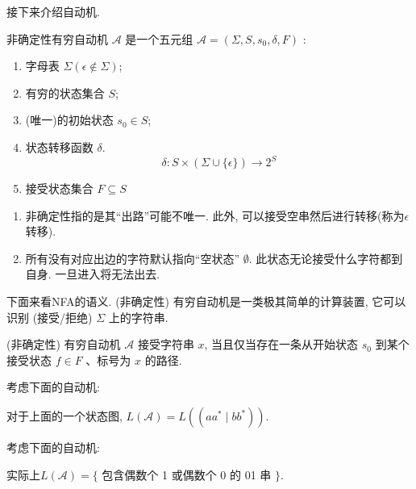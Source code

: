 \documentclass{ctexart}
\begin{document}
    接下来介绍自动机. 

    \begin{definition}[NFA]
        非确定性有穷自动机 $\mathcal{A}$ 是一个五元组 $\mathcal{A}=\left(\Sigma, S, s_0, \delta, F\right)$ :
        \begin{enumerate}
            \item 字母表 $\Sigma(\epsilon \notin \Sigma)$;
            \item 有穷的状态集合 $S$;
            \item (唯一)的初始状态 $s_0 \in S$;
            \item 状态转移函数 $\delta$.$$
            \delta: S \times(\Sigma \cup\{\epsilon\}) \rightarrow 2^S
            $$
            \item 接受状态集合 $F \subseteq S$
        \end{enumerate}

    \end{definition}

    \begin{remark}
        \begin{enumerate}
            \item 非确定性指的是其``出路''可能不唯一. 此外, 可以接受空串然后进行转移(称为$\epsilon$转移). 
            \item 所有没有对应出边的字符默认指向“空状态” $\emptyset$. 此状态无论接受什么字符都到自身. 一旦进入将无法出去.
        \end{enumerate}
    \end{remark}


    下面来看NFA的语义. (非确定性) 有穷自动机是一类极其简单的计算装置, 它可以识别 (接受/拒绝) $\Sigma$ 上的字符串. 

    \begin{definition}[接受(Accept)]
        (非确定性) 有穷自动机 $\mathcal{A}$ 接受字符串 $x$, 当且仅当存在一条从开始状态 $s_0$ 到某个接受状态 $f \in F$ 、标号为 $x$ 的路径.
    \end{definition}

    \begin{example}考虑下面的自动机: 


        对于上面的一个状态图, $L(\mathcal{A})=L\left(\left(a a^* \mid b b^*\right)\right)$. 
    \end{example}

    \begin{example}
        考虑下面的自动机: 


        实际上$L(\mathcal{A})=\{$ 包含偶数个 1 或偶数个 0 的 01 串 $\}$. 

    \end{example}
    
\end{document}
